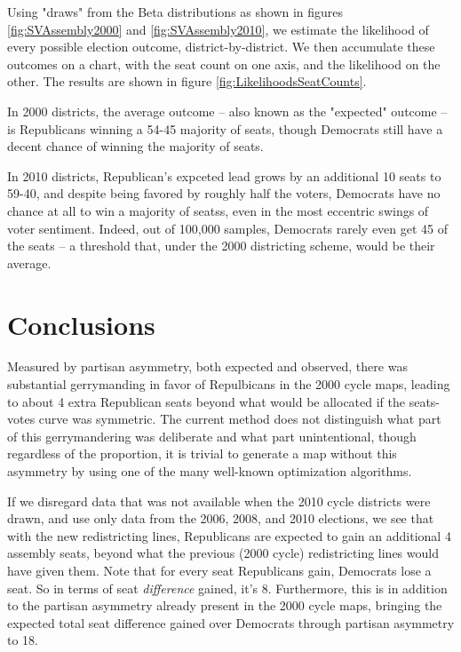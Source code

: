 \documentclass[preprint,12pt]{article}
\begin{document}
Using "draws" from the Beta distributions as shown in figures \ref{fig:SVAssembly2000} and \ref{fig:SVAssembly2010}, we estimate the likelihood of every possible election outcome, district-by-district.
We then accumulate these outcomes on a chart, with the seat count on one axis, and the likelihood on the other.  The results are shown in figure \ref{fig:LikelihoodsSeatCounts}.

In 2000 districts, the average outcome -- also known as the "expected" outcome -- is Republicans winning a 54-45 majority of seats, though Democrats still have a decent chance of winning the majority of seats. 

In 2010 districts, Republican's expceted lead grows by an additional 10 seats to 59-40, and despite being favored by roughly half the voters, Democrats have no chance at all to win a majority of seatss,  even in the most eccentric swings of voter sentiment.
Indeed, out of 100,000 samples, Democrats rarely even get 45 of the seats -- a threshold that, under the 2000 districting scheme, would be their average.

\section{Conclusions}

Measured by partisan asymmetry, both expected and observed, there was substantial gerrymanding in favor of Repulbicans in the 2000 cycle maps, leading to about 4 extra Republican seats beyond what would be allocated if the seats-votes curve was symmetric.
The current method does not distinguish what part of this gerrymandering was deliberate and what part unintentional, though regardless of the proportion, it is trivial to generate a map without this asymmetry by using one of the many well-known optimization algorithms.

If we disregard data that was not available when the 2010 cycle districts were drawn, and use only data from the 2006, 2008, and 2010 elections, we see that with the new redistricting lines, Republicans are expected to gain an additional 4 assembly seats, beyond what the previous (2000 cycle) redistricting lines would have given them.
Note that for every seat Republicans gain, Democrats lose a seat.  So in terms of seat \emph{difference} gained, it's 8.
Furthermore, this is in addition to the partisan asymmetry already present in the 2000 cycle maps, bringing the expected total seat difference gained over Democrats through partisan asymmetry to 18.
\end{document}
